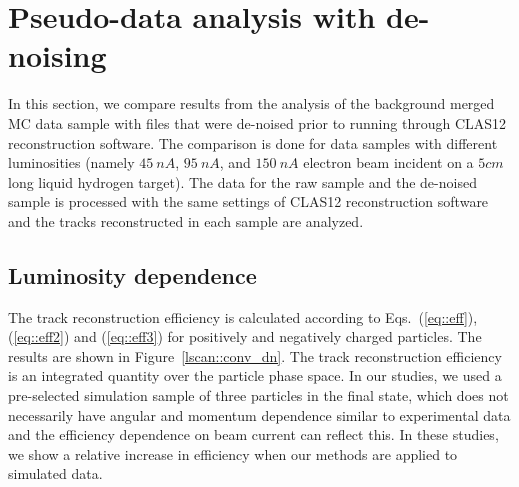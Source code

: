 \section{Pseudo-data analysis with de-noising}

In this section, we compare results from the analysis of the background merged MC data sample with files that were de-noised prior to running through CLAS12 reconstruction software. The comparison is done for data samples with different luminosities (namely $45~nA$, $95~nA$, and $150~nA$ electron beam incident on a $5cm$ long liquid hydrogen target). The data for the raw sample and the de-noised sample is processed with the same settings of CLAS12 reconstruction software and the tracks reconstructed in each sample are analyzed.

\subsection{Luminosity dependence}

The track reconstruction efficiency is calculated according to Eqs.~(\ref{eq::eff}), (\ref{eq::eff2}) and (\ref{eq::eff3}) for positively and negatively charged particles. The results are shown in Figure~\ref{lscan::conv_dn}. The track reconstruction efficiency is an integrated quantity over the particle phase space. In our studies, we used a pre-selected simulation sample of three particles in the final state, which does not necessarily have angular and momentum dependence similar to experimental data and the efficiency dependence on beam current can reflect this. In these studies, we show a relative increase in efficiency when our methods are applied to simulated data.

